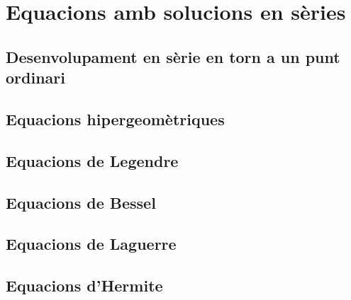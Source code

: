 \section{Equacions amb solucions en sèries}
\subsection{Desenvolupament en sèrie en torn a un punt ordinari}

\subsection{Equacions hipergeomètriques}

\subsection{Equacions de Legendre}

\subsection{Equacions de Bessel}

\subsection{Equacions de Laguerre}

\subsection{Equacions d'Hermite}